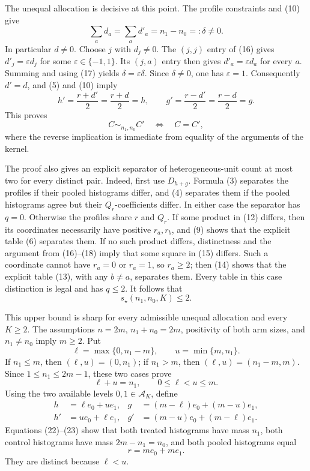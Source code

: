 The unequal allocation is decisive at this point.  The profile constraints
and (10) give
\[
 \sum_a d_a=\sum_a d'_a=n_1-n_0=:\delta\neq0.
 \tag{17}
\]
In particular \(d\neq0\).  Choose \(j\) with \(d_j\neq0\).  The
\((j,j)\) entry of (16) gives \(d'_j=\varepsilon d_j\) for some
\(\varepsilon\in\{-1,1\}\).  Its \((j,a)\) entry then gives
\(d'_a=\varepsilon d_a\) for every \(a\).  Summing and using (17) yields
\(\delta=\varepsilon\delta\).  Since \(\delta\neq0\), one has
\(\varepsilon=1\).  Consequently \(d'=d\), and (5) and (10) imply
\[
 h'=\frac{r+d'}2=\frac{r+d}2=h,
 \qquad
 g'=\frac{r-d'}2=\frac{r-d}2=g.
 \tag{18}
\]
This proves
\[
 C\sim_{n_1,n_0}C'\quad\Longleftrightarrow\quad C=C',
 \tag{19}
\]
where the reverse implication is immediate from equality of the arguments
of the kernel.

The proof also gives an explicit separator of heterogeneous-unit count at
most two for every distinct pair.  Indeed, first use \(D_{h+g}\).  Formula
(3) separates the profiles if their pooled histograms differ, and (4)
separates them if the pooled histograms agree but their \(Q_r\)-coefficients
differ.  In either case the separator has \(q=0\).  Otherwise the profiles
share \(r\) and \(Q_r\).  If some product in (12) differs, then its
coordinates necessarily have positive \(r_a,r_b\), and (9) shows that the
explicit table (6) separates them.  If no such product differs, distinctness
and the argument from (16)--(18) imply that some square in (15) differs.
Such a coordinate cannot have \(r_a=0\) or \(r_a=1\), so \(r_a\geq2\);
then (14) shows that the explicit table (13), with any \(b\neq a\),
separates them.  Every table in this case distinction is legal and has
\(q\leq2\).  It follows that
\[
 s_\star(n_1,n_0,K)\leq2.
 \tag{20}
\]

This upper bound is sharp for every admissible unequal allocation and every
\(K\geq2\).  The assumptions \(n=2m\), \(n_1+n_0=2m\), positivity of both
arm sizes, and \(n_1\neq n_0\) imply \(m\geq2\).  Put
\[
 \ell=\max\{0,n_1-m\},\qquad u=\min\{m,n_1\}.
 \tag{21}
\]
If \(n_1\leq m\), then \((\ell,u)=(0,n_1)\); if \(n_1>m\), then
\((\ell,u)=(n_1-m,m)\).  Since \(1\leq n_1\leq2m-1\), these two cases prove
\[
 \ell+u=n_1,\qquad 0\leq\ell<u\leq m.
 \tag{22}
\]
Using the two available levels \(0,1\in\mathcal A_K\), define
\[
 \begin{aligned}
 h&=\ell e_0+u e_1,
 &g&=(m-\ell)e_0+(m-u)e_1,\\
 h'&=u e_0+\ell e_1,
 &g'&=(m-u)e_0+(m-\ell)e_1.
 \end{aligned}
 \tag{23}
\]
Equations (22)--(23) show that both treated histograms have mass \(n_1\),
both control histograms have mass
\(2m-n_1=n_0\), and both pooled histograms equal
\[
 r=me_0+me_1.
 \tag{24}
\]
They are distinct because \(\ell<u\).


